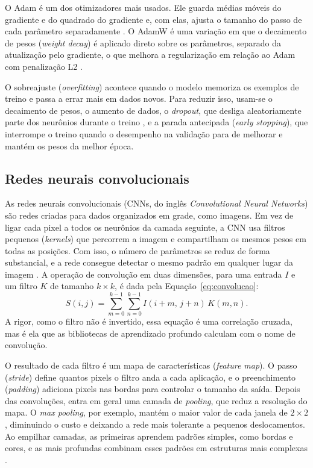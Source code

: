 O Adam é um dos otimizadores mais usados. Ele guarda médias móveis do gradiente e do quadrado do gradiente e, com elas, ajusta o tamanho do passo de cada parâmetro separadamente \cite{kingma2015adam}. O AdamW é uma variação em que o decaimento de pesos (\textit{weight decay}) é aplicado direto sobre os parâmetros, separado da atualização pelo gradiente, o que melhora a regularização em relação ao Adam com penalização L2 \cite{loshchilov2019adamw}.

O sobreajuste (\textit{overfitting}) acontece quando o modelo memoriza os exemplos de treino e passa a errar mais em dados novos. Para reduzir isso, usam-se o decaimento de pesos, o aumento de dados, o \textit{dropout}, que desliga aleatoriamente parte dos neurônios durante o treino \cite{srivastava2014dropout}, e a parada antecipada (\textit{early stopping}), que interrompe o treino quando o desempenho na validação para de melhorar e mantém os pesos da melhor época.

\subsection{Redes neurais convolucionais}
\label{sec:cnn}

As redes neurais convolucionais (CNNs, do inglês \textit{Convolutional Neural Networks}) são redes criadas para dados organizados em grade, como imagens. Em vez de ligar cada pixel a todos os neurônios da camada seguinte, a CNN usa filtros pequenos (\textit{kernels}) que percorrem a imagem e compartilham os mesmos pesos em todas as posições. Com isso, o número de parâmetros se reduz de forma substancial, e a rede consegue detectar o mesmo padrão em qualquer lugar da imagem \cite{lecun2015deep}. A operação de convolução em duas dimensões, para uma entrada $I$ e um filtro $K$ de tamanho $k \times k$, é dada pela Equação~\ref{eq:convolucao}:
\begin{equation}
	\label{eq:convolucao}
	S(i,j) = \sum_{m=0}^{k-1} \sum_{n=0}^{k-1} I(i+m,\, j+n)\, K(m,n).
\end{equation}
A rigor, como o filtro não é invertido, essa equação é uma correlação cruzada, mas é ela que as bibliotecas de aprendizado profundo calculam com o nome de convolução.

O resultado de cada filtro é um mapa de características (\textit{feature map}). O passo (\textit{stride}) define quantos pixels o filtro anda a cada aplicação, e o preenchimento (\textit{padding}) adiciona pixels nas bordas para controlar o tamanho da saída. Depois das convoluções, entra em geral uma camada de \textit{pooling}, que reduz a resolução do mapa. O \textit{max pooling}, por exemplo, mantém o maior valor de cada janela de $2 \times 2$, diminuindo o custo e deixando a rede mais tolerante a pequenos deslocamentos. Ao empilhar camadas, as primeiras aprendem padrões simples, como bordas e cores, e as mais profundas combinam esses padrões em estruturas mais complexas \cite{lecun2015deep}.


